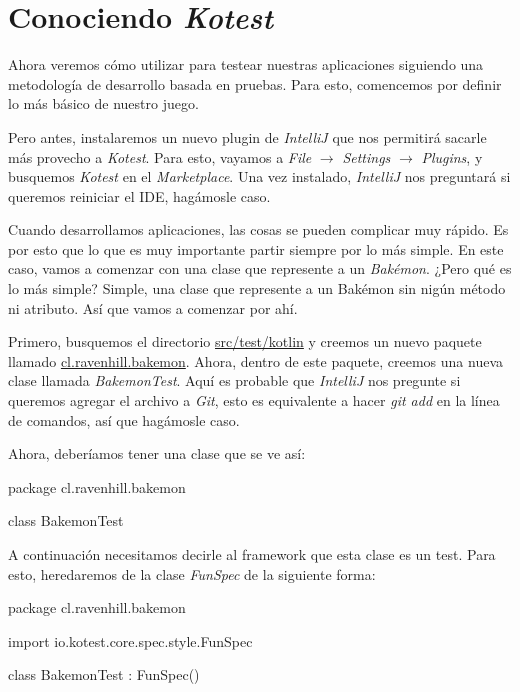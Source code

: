 \section{Conociendo \textit{Kotest}}
\label{sec:conociendo-kotest}

  Ahora veremos cómo utilizar  para testear nuestras aplicaciones siguiendo una
  metodología de desarrollo basada en pruebas.
  Para esto, comencemos por definir lo más básico de nuestro juego.

  Pero antes, instalaremos un nuevo plugin de \textit{IntelliJ} que nos permitirá sacarle más 
  provecho a \textit{Kotest}.
  Para esto, vayamos a \textit{File} $\rightarrow$ \textit{Settings} $\rightarrow$ \textit{Plugins},
  y busquemos \textit{Kotest} en el \textit{Marketplace}.
  Una vez instalado, \textit{IntelliJ} nos preguntará si queremos reiniciar el IDE, hagámosle caso.

  Cuando desarrollamos aplicaciones, las cosas se pueden complicar muy rápido.
  Es por esto que lo que es muy importante partir siempre por lo más simple.
  En este caso, vamos a comenzar con una clase que represente a un \textit{Bakémon}.
  ¿Pero qué es lo más simple?
  Simple, una clase que represente a un Bakémon sin nigún método ni atributo.
  Así que vamos a comenzar por ahí.

  Primero, busquemos el directorio \url{src/test/kotlin} y creemos un nuevo paquete llamado 
  \url{cl.ravenhill.bakemon}.
  Ahora, dentro de este paquete, creemos una nueva clase llamada \textit{BakemonTest}.
  Aquí es probable que \textit{IntelliJ} nos pregunte si queremos agregar el archivo a \textit{Git},
  esto es equivalente a hacer \textit{git add} en la línea de comandos, así que hagámosle caso.

  Ahora, deberíamos tener una clase que se ve así:

  \begin{kotlin}
    package cl.ravenhill.bakemon

    class BakemonTest {
    }
  \end{kotlin}

  A continuación necesitamos decirle al framework que esta clase es un test.
  Para esto, heredaremos de la clase \textit{FunSpec} de la siguiente forma:

  \begin{kotlin}
    package cl.ravenhill.bakemon

    import io.kotest.core.spec.style.FunSpec

    class BakemonTest : FunSpec({})
  \end{kotlin}

